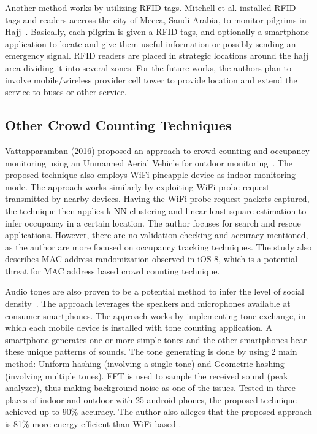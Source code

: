 	Another method works by utilizing \ac{RFID} tags. Mitchell et al. installed \ac{RFID} tags and readers accross the city of Mecca, Saudi Arabia, to monitor pilgrims in Hajj~\cite{thesis050}. Basically, each pilgrim is given a \ac{RFID} tags, and optionally a smartphone application to locate and give them useful information or possibly sending an emergency signal. \ac{RFID} readers are placed in strategic locations around the hajj area dividing it into several zones. For the future works, the authors plan to involve mobile/wireless provider cell tower to provide location and extend the service to buses or other service.









	\subsection{Other Crowd Counting Techniques} %
	\label{sub:other_crowd_counting_techniques}
	Vattapparamban (2016) proposed an approach to crowd counting and occupancy monitoring using an Unmanned Aerial Vehicle for outdoor monitoring~\cite{thesis053}. The proposed technique also employs WiFi pineapple device as indoor monitoring mode. The approach works similarly by exploiting WiFi probe request transmitted by nearby devices. Having the WiFi probe request packets captured, the technique then applies \ac{k-NN} clustering and linear least square estimation to infer occupancy in a certain location. The author focuses for search and rescue applications. However, there are no validation checking and accuracy mentioned, as the author are more focused on occupancy tracking techniques. The study also describes \ac{MAC} address randomization observed in iOS 8, which is a potential threat for \ac{MAC} address based crowd counting technique.

	Audio tones are also proven to be a potential method to infer the level of social density~\cite{thesis044}. The approach leverages the speakers and microphones available at consumer smartphones. The approach works by implementing tone exchange, in which each mobile device is installed with tone counting application. A smartphone generates one or more simple tones and the other smartphones hear these unique patterns of sounds. The tone generating is done by using 2 main method: Uniform hashing (involving a single tone) and Geometric hashing (involving multiple tones). FFT is used to sample the received sound (peak analyzer), thus making background noise as one of the issues. Tested in three places of indoor and outdoor with 25 android phones, the proposed technique achieved up to 90\% accuracy. The author also alleges that the proposed approach is 81\% more energy efficient than WiFi-based .

